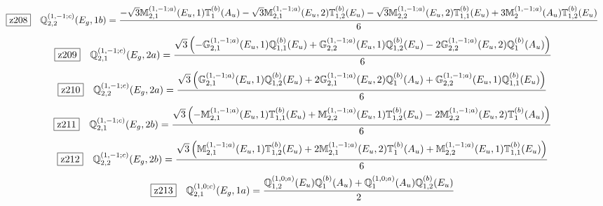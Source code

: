 \documentclass[fleqn,10pt,landscape]{jsarticle}
\begin{document}
\begin{dmath*}
\hspace*{3mm}\fbox{z208}\quad \mathbb{Q}_{2,2}^{(1,-1;c)}(E_{g},1b)=\frac{- \sqrt{3} \mathbb{M}_{2,1}^{(1,-1;a)}(E_{u},1) \mathbb{T}_{1}^{(b)}(A_{u}) - \sqrt{3} \mathbb{M}_{2,1}^{(1,-1;a)}(E_{u},2) \mathbb{T}_{1,2}^{(b)}(E_{u}) - \sqrt{3} \mathbb{M}_{2,2}^{(1,-1;a)}(E_{u},2) \mathbb{T}_{1,1}^{(b)}(E_{u}) + 3 \mathbb{M}_{2}^{(1,-1;a)}(A_{u}) \mathbb{T}_{1,2}^{(b)}(E_{u})}{6}
\end{dmath*}
\begin{dmath*}
\hspace*{3mm}\fbox{z209}\quad \mathbb{Q}_{2,1}^{(1,-1;c)}(E_{g},2a)=\frac{\sqrt{3} \left(- \mathbb{G}_{2,1}^{(1,-1;a)}(E_{u},1) \mathbb{Q}_{1,1}^{(b)}(E_{u}) + \mathbb{G}_{2,2}^{(1,-1;a)}(E_{u},1) \mathbb{Q}_{1,2}^{(b)}(E_{u}) - 2 \mathbb{G}_{2,2}^{(1,-1;a)}(E_{u},2) \mathbb{Q}_{1}^{(b)}(A_{u})\right)}{6}
\end{dmath*}
\begin{dmath*}
\hspace*{3mm}\fbox{z210}\quad \mathbb{Q}_{2,2}^{(1,-1;c)}(E_{g},2a)=\frac{\sqrt{3} \left(\mathbb{G}_{2,1}^{(1,-1;a)}(E_{u},1) \mathbb{Q}_{1,2}^{(b)}(E_{u}) + 2 \mathbb{G}_{2,1}^{(1,-1;a)}(E_{u},2) \mathbb{Q}_{1}^{(b)}(A_{u}) + \mathbb{G}_{2,2}^{(1,-1;a)}(E_{u},1) \mathbb{Q}_{1,1}^{(b)}(E_{u})\right)}{6}
\end{dmath*}
\begin{dmath*}
\hspace*{3mm}\fbox{z211}\quad \mathbb{Q}_{2,1}^{(1,-1;c)}(E_{g},2b)=\frac{\sqrt{3} \left(- \mathbb{M}_{2,1}^{(1,-1;a)}(E_{u},1) \mathbb{T}_{1,1}^{(b)}(E_{u}) + \mathbb{M}_{2,2}^{(1,-1;a)}(E_{u},1) \mathbb{T}_{1,2}^{(b)}(E_{u}) - 2 \mathbb{M}_{2,2}^{(1,-1;a)}(E_{u},2) \mathbb{T}_{1}^{(b)}(A_{u})\right)}{6}
\end{dmath*}
\begin{dmath*}
\hspace*{3mm}\fbox{z212}\quad \mathbb{Q}_{2,2}^{(1,-1;c)}(E_{g},2b)=\frac{\sqrt{3} \left(\mathbb{M}_{2,1}^{(1,-1;a)}(E_{u},1) \mathbb{T}_{1,2}^{(b)}(E_{u}) + 2 \mathbb{M}_{2,1}^{(1,-1;a)}(E_{u},2) \mathbb{T}_{1}^{(b)}(A_{u}) + \mathbb{M}_{2,2}^{(1,-1;a)}(E_{u},1) \mathbb{T}_{1,1}^{(b)}(E_{u})\right)}{6}
\end{dmath*}
\begin{dmath*}
\hspace*{3mm}\fbox{z213}\quad \mathbb{Q}_{2,1}^{(1,0;c)}(E_{g},1a)=\frac{\mathbb{Q}_{1,2}^{(1,0;a)}(E_{u}) \mathbb{Q}_{1}^{(b)}(A_{u}) + \mathbb{Q}_{1}^{(1,0;a)}(A_{u}) \mathbb{Q}_{1,2}^{(b)}(E_{u})}{2}
\end{dmath*}
\end{document}
